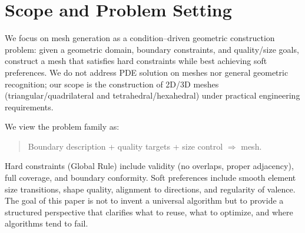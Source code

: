 \section{Scope and Problem Setting}
We focus on mesh generation as a condition--driven geometric construction problem: given a geometric domain, boundary constraints, and quality/size goals, construct a mesh that satisfies hard constraints while best achieving soft preferences. We do not address PDE solution on meshes nor general geometric recognition; our scope is the construction of 2D/3D meshes (triangular/quadrilateral and tetrahedral/hexahedral) under practical engineering requirements.

We view the problem family as:
\begin{quote}
Boundary description + quality targets + size control $\Rightarrow$ mesh.
\end{quote}
Hard constraints (Global Rule) include validity (no overlaps, proper adjacency), full coverage, and boundary conformity. Soft preferences include smooth element size transitions, shape quality, alignment to directions, and regularity of valence. The goal of this paper is not to invent a universal algorithm but to provide a structured perspective that clarifies what to reuse, what to optimize, and where algorithms tend to fail.
